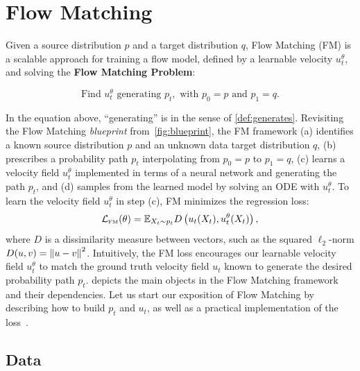 \documentclass{fairmeta}
\newcommand{\highlight}[1]{{\color{metablue} \textbf{#1}}}
\renewcommand{\eqref}[1]{\labelcref{#1}}
\numberwithin{equation}{section}
\begin{document}
\section{Flow Matching}\label{s:fm_continuous}
Given a source distribution $p$ and a target distribution $q$, Flow Matching (FM) \citep{lipman2022flow,liu2022flow,albergo2022building} is a scalable approach for training a flow model, defined by a learnable velocity $u_t^\theta$, and solving the \highlight{Flow Matching Problem}:
\begin{myframe}
    \begin{equation}\label{prob:gen_flow}
    \text{Find } u^\theta_t \text{ generating } p_t, \text{ with } p_0=p \text{ and } p_1=q.
\end{equation}
\end{myframe}
In the equation above, ``generating'' is in the sense of \cref{def:generates}.
Revisiting the Flow Matching \emph{blueprint} from~\cref{fig:blueprint}, the FM framework (a) identifies a known source distribution $p$ and an unknown data target distribution $q$, (b) prescribes a probability path $p_t$ interpolating from $p_0=p$ to $p_1=q$, (c) learns a velocity field $u^\theta_t$ implemented in terms of a neural network and generating the path $p_t$, and (d) samples from the learned model by solving an ODE with $u^\theta_t$. 
To learn the velocity field $u^\theta_t$ in step (c), FM minimizes the regression loss: 
\begin{equation}\label{e:loss_fm}
     {\mathcal{L}}_{\scriptscriptstyle \text{FM}}(\theta) = \mathbb{E}_{X_t\sim p_t} D\left ( u_t(X_t) , u^\theta_t(X_t)\right ), 
\end{equation}
where $D$ is a dissimilarity measure between vectors, such as the squared $\ell_2$-norm $D(u, v) = \left\Vert u-v\right\Vert^2$.
Intuitively, the FM loss encourages our learnable velocity field $u_t^\theta$ to match the ground truth velocity field $u_t$ known to generate the desired probability path $p_t$.
 depicts the main objects in the Flow Matching framework and their dependencies.
Let us start our exposition of Flow Matching by describing how to build $p_t$ and $u_t$, as well as a practical implementation of the loss~\eqref{e:loss_fm}.

\subsection{Data} 
\end{document}
